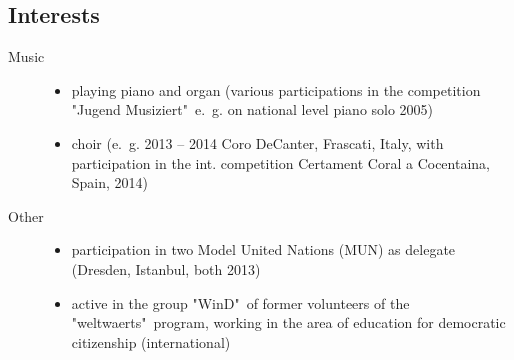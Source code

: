 \documentclass[a4paper, oneside, final]{scrartcl} %
\newcommand{\gray}{\rowcolor[gray]{.90}} %
\begin{document}
\begin{center}

\section{Interests}

\begin{description}
    \item[Music]
        \begin{itemize}
            \item playing piano and organ (various participations in the 
                    competition "Jugend Musiziert"\, e.~g. on national level piano solo 2005)
            \item choir (e.~g. 2013 -- 2014 Coro DeCanter, Frascati, Italy, with participation in the 
                    int. competition Certament Coral a Cocentaina, Spain, 2014)
        \end{itemize}
    \item[Other]
        \begin{itemize}
            \item participation in two Model United Nations (MUN) as delegate 
                (Dresden, Istanbul, both 2013) \\
            \item active in the group "WinD"\ of former volunteers of the "weltwaerts"\ program, 
                working in the area of education for democratic citizenship (international) \\
        \end{itemize}
\end{description}

\end{center}



\end{document}

